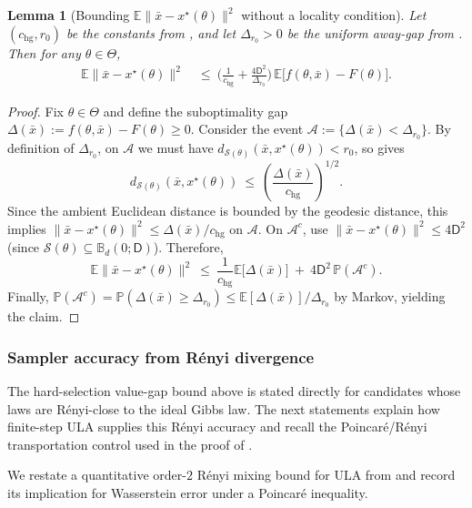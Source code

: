 \documentclass{article}
\theoremstyle{normaltheorem}
\newtheorem{lemma}[lemma]{Lemma}
\newcommand{\calS}{\mathcal{S}}
\begin{document}
\begin{lemma}[Bounding $\mathbb E\|\bar x-x^\star(\theta)\|^2$ without a locality condition]\label{lem:barx-distance}
Let $(c_{\mathrm{hg}},r_0)$ be the constants from , and let \(\Delta_{r_0}>0\) be the uniform away-gap from .
Then for any $\theta\in\Theta$,
\[
\begin{aligned}
\mathbb E\|\bar x-x^\star(\theta)\|^2
&\ \le\
\Bigg(\frac{1}{c_{\mathrm{hg}}}+\frac{4\mathsf D^2}{\Delta_{r_0}}\Bigg)\,
\mathbb E\big[f(\theta,\bar x)-F(\theta)\big].
\end{aligned}
\]
\end{lemma}
\begin{proof}
Fix $\theta\in\Theta$ and define the suboptimality gap $\Delta(\bar x):=f(\theta,\bar x)-F(\theta)\ge 0$.
Consider the event $\mathcal A:=\{\Delta(\bar x)<\Delta_{r_0}\}$.
By definition of $\Delta_{r_0}$, on $\mathcal A$ we must have $d_{\calS(\theta)}(\bar x,x^\star(\theta))<r_0$, so
\Cref{lem:uniform-hg} gives
\[
d_{\calS(\theta)}(\bar x,x^\star(\theta))
\ \le\
\left(\frac{\Delta(\bar x)}{c_{\mathrm{hg}}}\right)^{1/2}.
\]
Since the ambient Euclidean distance is bounded by the geodesic distance, this implies
$\|\bar x-x^\star(\theta)\|^2\le \Delta(\bar x)/c_{\mathrm{hg}}$ on $\mathcal A$.
On $\mathcal A^c$, use $\|\bar x-x^\star(\theta)\|^2\le 4\mathsf D^2$ (since $\calS(\theta)\subseteq \mathbb B_d(0;\mathsf D)$).
Therefore,
\[
\mathbb E\|\bar x-x^\star(\theta)\|^2
\ \le\
\frac{1}{c_{\mathrm{hg}}}\mathbb E\big[\Delta(\bar x)\big]
\ +\ 4\mathsf D^2\,\mathbb P(\mathcal A^c).
\]
Finally, $\mathbb P(\mathcal A^c)=\mathbb P(\Delta(\bar x)\ge \Delta_{r_0})\le \mathbb E[\Delta(\bar x)]/\Delta_{r_0}$ by Markov,
yielding the claim.
\end{proof}

\subsubsection{Sampler accuracy from R\'enyi divergence}
The hard-selection value-gap bound above is stated directly for candidates whose laws are R\'enyi-close to the ideal Gibbs law.
The next statements explain how finite-step ULA supplies this R\'enyi accuracy and recall the Poincar\'e/R\'enyi transportation control used in the proof of .

We restate a quantitative order-$2$ R\'enyi mixing bound for ULA from \citet[Prop.~5.6]{masiha2025superquantile} and record its implication for Wasserstein error under a Poincar\'e inequality.
\end{document}
